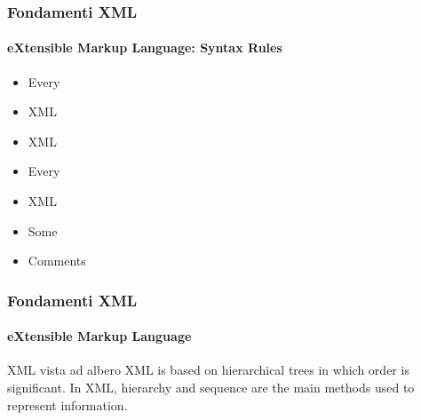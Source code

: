 \begin{frame}
	\frametitle{Fondamenti XML}
	\framesubtitle{eXtensible Markup Language: Syntax Rules}
	\addtocounter{nframe}{1}

	\begin{itemize}

		\item Every %

		\item XML %

		\item XML %

		\item Every %

		\item XML %

		\item Some %

		\item Comments %

	\end{itemize}

\end{frame}


\begin{frame}
	\frametitle{Fondamenti XML}
	\framesubtitle{eXtensible Markup Language}
	\addtocounter{nframe}{1}

	\begin{block}{XML vista ad albero}
		XML is based on hierarchical trees in which order is significant.
		In XML, hierarchy and sequence are the main methods used to represent information.
	\end{block}

\end{frame}

